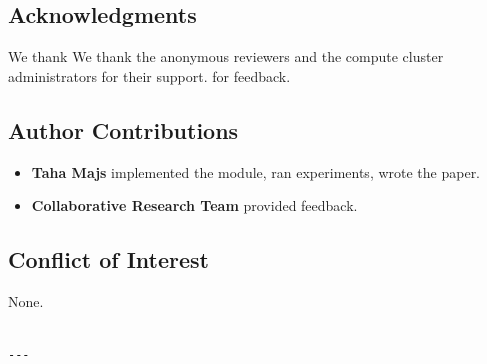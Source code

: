 \subsection{Acknowledgments}

We thank We thank the anonymous reviewers and the compute cluster administrators for their support. for feedback.

\subsection{Author Contributions}

\begin{itemize}
\item \textbf{Taha Majs} implemented the module, ran experiments, wrote the paper.
\item \textbf{Collaborative Research Team} provided feedback.

\end{itemize}
\subsection{Conflict of Interest}

None.
\begin{lstlisting}

---
\end{lstlisting}